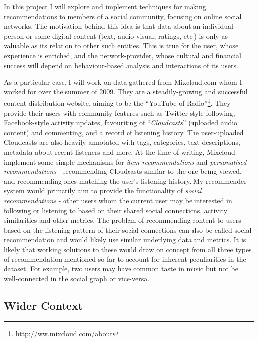 In this project I will explore and implement techniques for making recommendations to members of a social community, focusing on online social networks. The motivation behind this idea is that data about an individual person or some digital content (text, audio-visual, ratings, etc.) is only as valuable as its relation to other such entities. This is true for the user, whose experience is enriched, and the network-provider, whose cultural and financial success will depend on behaviour-based analysis and interactions of its users.

As a particular case, I will work on data gathered from Mixcloud.com whom I worked for over the summer of 2009. They are a steadily-growing and successful content distribution website, aiming to be the ``YouTube of Radio''\footnote{http://ww.mixcloud.com/about}. They provide their users with community features such as Twitter-style following, Facebook-style activity updates, favouriting of ``\emph{Cloudcasts}'' (uploaded audio content) and commenting, and a record of listening history. The user-uploaded Cloudcasts are also heavily annotated with tags, categories, text descriptions, metadata about recent listeners and more. At the time of writing, Mixcloud implement some simple mechanisms for \emph{item recommendations} and \emph{personalised recommendations} - recommending Cloudcasts similar to the one being viewed, and recommending ones matching the user's listening history. My recommender system would primarily aim to provide the functionality of \emph{social recommendations} - other users whom the current user may be interested in following or listening to based on their shared social connections, activity similarities and other metrics. The problem of recommending content to users based on the listening pattern of their social connections can also be called social recommendation and would likely use similar underlying data and metrics. It is likely that working solutions to these would draw on concept from all three types of recommendation mentioned so far to account for inherent peculiarities in the dataset. For example, two users may have common taste in music but not be well-connected in the social graph or vice-versa.

\subsection*{Wider Context}

